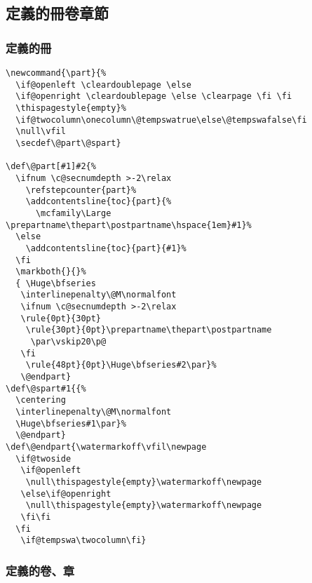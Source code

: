 \subsection{定義的冊卷章節}

\subsubsection{定義的冊}

\begin{lstlisting}[firstnumber=956]
%定義的冊
\newcommand{\part}{%
  \if@openleft \cleardoublepage \else
  \if@openright \cleardoublepage \else \clearpage \fi \fi
  \thispagestyle{empty}%
  \if@twocolumn\onecolumn\@tempswatrue\else\@tempswafalse\fi
  \null\vfil
  \secdef\@part\@spart}

\def\@part[#1]#2{%
  \ifnum \c@secnumdepth >-2\relax
    \refstepcounter{part}%
    \addcontentsline{toc}{part}{%
      \mcfamily\Large \prepartname\thepart\postpartname\hspace{1em}#1}%
  \else
    \addcontentsline{toc}{part}{#1}%
  \fi
  \markboth{}{}%
  { \Huge\bfseries
   \interlinepenalty\@M\normalfont
   \ifnum \c@secnumdepth >-2\relax
   \rule{0pt}{30pt}
    \rule{30pt}{0pt}\prepartname\thepart\postpartname
     \par\vskip20\p@
   \fi
    \rule{48pt}{0pt}\Huge\bfseries#2\par}%
   \@endpart}
\def\@spart#1{{%
  \centering
  \interlinepenalty\@M\normalfont
  \Huge\bfseries#1\par}%
  \@endpart}
\def\@endpart{\watermarkoff\vfil\newpage
  \if@twoside
   \if@openleft
    \null\thispagestyle{empty}\watermarkoff\newpage
   \else\if@openright
    \null\thispagestyle{empty}\watermarkoff\newpage
   \fi\fi
  \fi
   \if@tempswa\twocolumn\fi}
\end{lstlisting}

\subsubsection{定義的卷、章}

